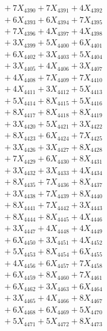 \documentclass[a4paper,10pt]{article}
\begin{document}
{\begin{align}
&\;  + 7 X_{4390} + 7 X_{4391} + 4 X_{4392} \\[0.3ex]
&\;  + 6 X_{4393} + 6 X_{4394} + 7 X_{4395} \\[0.3ex]
&\;  + 7 X_{4396} + 4 X_{4397} + 4 X_{4398} \\[0.3ex]
&\;  + 3 X_{4399} + 5 X_{4400} + 6 X_{4401} \\[0.3ex]
&\;  + 6 X_{4402} + 3 X_{4403} + 5 X_{4404} \\[0.3ex]
&\;  + 3 X_{4405} + 4 X_{4406} + 3 X_{4407} \\[0.3ex]
&\;  + 4 X_{4408} + 7 X_{4409} + 7 X_{4410} \\[0.3ex]
&\;  + 4 X_{4411} + 3 X_{4412} + 5 X_{4413} \\[0.3ex]
&\;  + 5 X_{4414} + 8 X_{4415} + 5 X_{4416} \\[0.3ex]
&\;  + 8 X_{4417} + 8 X_{4418} + 8 X_{4419} \\[0.5ex]\allowbreak
&\;  + 3 X_{4420} + 5 X_{4421} + 3 X_{4422} \\[0.3ex]
&\;  + 8 X_{4423} + 6 X_{4424} + 7 X_{4425} \\[0.3ex]
&\;  + 3 X_{4426} + 3 X_{4427} + 8 X_{4428} \\[0.3ex]
&\;  + 7 X_{4429} + 6 X_{4430} + 8 X_{4431} \\[0.3ex]
&\;  + 3 X_{4432} + 3 X_{4433} + 4 X_{4434} \\[0.3ex]
&\;  + 8 X_{4435} + 7 X_{4436} + 8 X_{4437} \\[0.3ex]
&\;  + 3 X_{4438} + 7 X_{4439} + 8 X_{4440} \\[0.3ex]
&\;  + 8 X_{4441} + 7 X_{4442} + 3 X_{4443} \\[0.3ex]
&\;  + 8 X_{4444} + 8 X_{4445} + 4 X_{4446} \\[0.3ex]
&\;  + 3 X_{4447} + 4 X_{4448} + 4 X_{4449} \\[0.5ex]\allowbreak
&\;  + 6 X_{4450} + 3 X_{4451} + 4 X_{4452} \\[0.3ex]
&\;  + 5 X_{4453} + 8 X_{4454} + 6 X_{4455} \\[0.3ex]
&\;  + 4 X_{4456} + 6 X_{4457} + 7 X_{4458} \\[0.3ex]
&\;  + 6 X_{4459} + 8 X_{4460} + 7 X_{4461} \\[0.3ex]
&\;  + 6 X_{4462} + 3 X_{4463} + 6 X_{4464} \\[0.3ex]
&\;  + 3 X_{4465} + 4 X_{4466} + 8 X_{4467} \\[0.3ex]
&\;  + 6 X_{4468} + 6 X_{4469} + 5 X_{4470} \\[0.3ex]
&\;  + 5 X_{4471} + 5 X_{4472} + 8 X_{4473} \\[0.3ex]

\end{align}}
\end{document}
